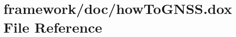 \hypertarget{how_to_g_n_s_s_8dox}{}\section{framework/doc/how\+To\+G\+N\+SS.dox File Reference}
\label{how_to_g_n_s_s_8dox}
